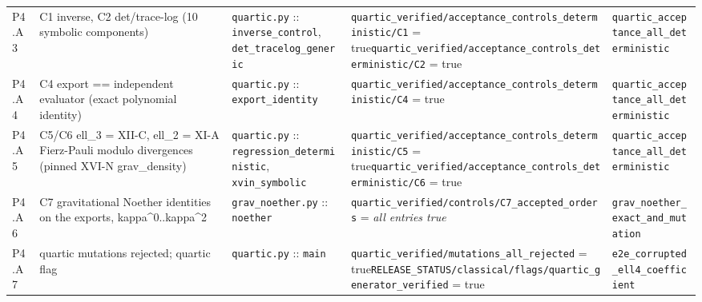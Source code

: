 {\begin{longtable}{@{}p{0.9cm}p{4.1cm}p{3.5cm}p{5.0cm}p{3.0cm}@{}}
P4.A3 & C1 inverse, C2 det/trace-log (10 symbolic components) & \texttt{quartic.\allowbreak{}py} :: \texttt{inverse\_\allowbreak{}control}, \texttt{det\_\allowbreak{}tracelog\_\allowbreak{}generic} & \texttt{quartic\_\allowbreak{}verified/\allowbreak{}acceptance\_\allowbreak{}controls\_\allowbreak{}deterministic/\allowbreak{}C1} = true\newline \texttt{quartic\_\allowbreak{}verified/\allowbreak{}acceptance\_\allowbreak{}controls\_\allowbreak{}deterministic/\allowbreak{}C2} = true & \texttt{quartic\_\allowbreak{}acceptance\_\allowbreak{}all\_\allowbreak{}deterministic} \\
P4.A4 & C4 export == independent evaluator (exact polynomial identity) & \texttt{quartic.\allowbreak{}py} :: \texttt{export\_\allowbreak{}identity} & \texttt{quartic\_\allowbreak{}verified/\allowbreak{}acceptance\_\allowbreak{}controls\_\allowbreak{}deterministic/\allowbreak{}C4} = true & \texttt{quartic\_\allowbreak{}acceptance\_\allowbreak{}all\_\allowbreak{}deterministic} \\
P4.A5 & C5/C6 ell\_3 = XII-C, ell\_2 = XI-A Fierz-Pauli modulo divergences (pinned XVI-N grav\_density) & \texttt{quartic.\allowbreak{}py} :: \texttt{regression\_\allowbreak{}deterministic}, \texttt{xvin\_\allowbreak{}symbolic} & \texttt{quartic\_\allowbreak{}verified/\allowbreak{}acceptance\_\allowbreak{}controls\_\allowbreak{}deterministic/\allowbreak{}C5} = true\newline \texttt{quartic\_\allowbreak{}verified/\allowbreak{}acceptance\_\allowbreak{}controls\_\allowbreak{}deterministic/\allowbreak{}C6} = true & \texttt{quartic\_\allowbreak{}acceptance\_\allowbreak{}all\_\allowbreak{}deterministic} \\
P4.A6 & C7 gravitational Noether identities on the exports, kappa\^{}0..kappa\^{}2 & \texttt{grav\_\allowbreak{}noether.\allowbreak{}py} :: \texttt{noether} & \texttt{quartic\_\allowbreak{}verified/\allowbreak{}controls/\allowbreak{}C7\_\allowbreak{}accepted\_\allowbreak{}orders} = \emph{all entries true} & \texttt{grav\_\allowbreak{}noether\_\allowbreak{}exact\_\allowbreak{}and\_\allowbreak{}mutation} \\
P4.A7 & quartic mutations rejected; quartic flag & \texttt{quartic.\allowbreak{}py} :: \texttt{main} & \texttt{quartic\_\allowbreak{}verified/\allowbreak{}mutations\_\allowbreak{}all\_\allowbreak{}rejected} = true\newline \texttt{RELEASE\_\allowbreak{}STATUS/\allowbreak{}classical/\allowbreak{}flags/\allowbreak{}quartic\_\allowbreak{}generator\_\allowbreak{}verified} = true & \texttt{e2e\_\allowbreak{}corrupted\_\allowbreak{}ell4\_\allowbreak{}coefficient} \\

\end{longtable}}

